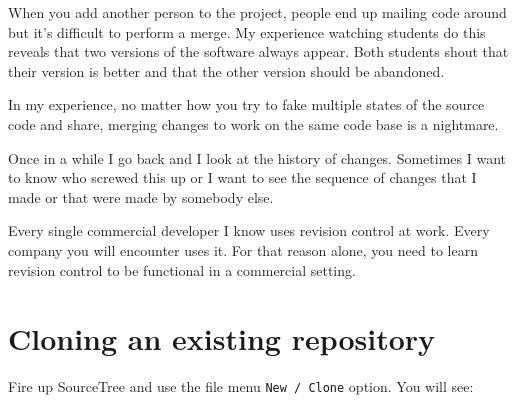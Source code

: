 \begin{fullwidth}
When you add another person to the project, people end up mailing code around but it's difficult to perform a merge. My experience watching students do this reveals that two versions of the software always appear. Both students shout that their version is better and that the other version should be abandoned.

In my experience, no matter how you try to fake multiple states of the source code and share, merging changes to work on the same code base is a nightmare.

Once in a while I go back and I look at the history of changes. Sometimes I want to know who screwed this up or I want to see the sequence of changes that I made or that were made by somebody else.

Every single commercial developer I know uses revision control at work. Every company you will encounter uses it. For that reason alone, you need to learn revision control to be functional in a commercial setting.

\section{Cloning an existing repository}

Fire up SourceTree and use the file menu {\tt New / Clone} option. You will see:
\vspace{5mm}


\end{fullwidth}
